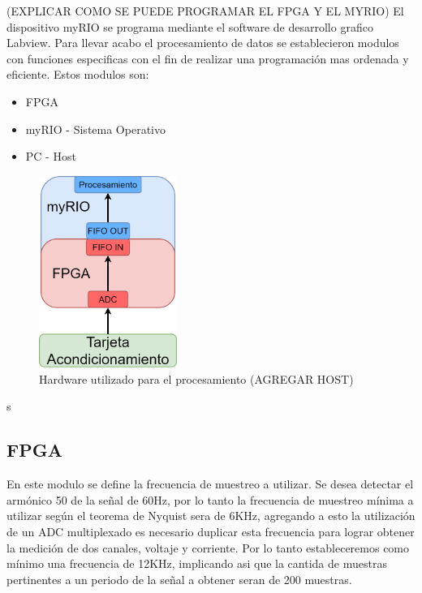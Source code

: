  \par (EXPLICAR COMO SE PUEDE PROGRAMAR EL FPGA Y EL MYRIO) El dispositivo myRIO se programa mediante el software de desarrollo grafico Labview. Para llevar acabo el procesamiento de datos se establecieron modulos con funciones especificas con el fin de realizar una programación mas ordenada y eficiente. Estos modulos son:

  \begin{itemize}
    \item FPGA
    \item myRIO - Sistema Operativo
    \item PC - Host
  \end{itemize}
  \begin{figure}[H]
    \centering
    \includegraphics[width=0.4\textwidth]{../Imagenes/estructura_procesamiento.png}
    \caption{Hardware utilizado para el procesamiento (AGREGAR HOST)}
    \label{fig:Hardware_Pro}
  \end{figure}s

  \subsection{FPGA}
    \par En este modulo se define la frecuencia de muestreo a utilizar. Se desea detectar el armónico 50 de la señal de 60Hz, por lo tanto la frecuencia de muestreo mínima a utilizar según el teorema de Nyquist sera de 6KHz, agregando a esto la utilización de un ADC multiplexado es necesario duplicar esta frecuencia para lograr obtener la medición de dos canales, voltaje y corriente. Por lo tanto estableceremos como mínimo una frecuencia de 12KHz, implicando asi que la cantida de muestras pertinentes a un periodo de la señal a obtener seran de 200 muestras.

